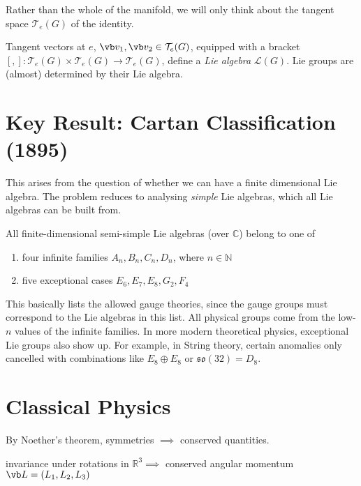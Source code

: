Rather than the whole of the manifold, we will only think about the tangent space $\mathcal{T}_e (G)$ of the identity.

Tangent vectors at $e$, $\vb v_1, \vb v_2 \in \mathcal{T}_e (G)$, equipped with a bracket $[, ]: \mathcal{T}_e(G) \times \mathcal{T}_e(G) \rightarrow \mathcal{T}_e(G)$, define a \emph{Lie algebra} $\mathcal{L}(G)$.
Lie groups are (almost) determined by their Lie algebra.

\section{Key Result: Cartan Classification (1895)}%
\label{sec:key_result_cartan_classification}

This arises from the question of whether we can have a finite dimensional Lie algebra. The problem reduces to analysing \emph{simple} Lie algebras, which all Lie algebras can be built from.

\begin{theorem}
  All finite-dimensional semi-simple Lie algebras (over $\mathbb{C}$) belong to one of
  \begin{enumerate}
    \item four infinite families $A_n, B_n, C_{n}, D_n$, where $n \in \mathbb{N}$
    \item five exceptional cases $E_6, E_7, E_8, G_2, F_4$
  \end{enumerate}
\end{theorem}

This basically lists the allowed gauge theories, since the gauge groups must correspond to the Lie algebras in this list. All physical groups come from the low-$n$ values of the infinite families. In more modern theoretical physics, exceptional Lie groups also show up. For example, in String theory, certain anomalies only cancelled with combinations like $E_8 \oplus E_8$ or $\mathfrak{so}(32) = D_8$.

\section{Classical Physics}%
\label{sec:classical_physics}

By Noether's theorem, symmetries $\implies$ conserved quantities.

\begin{example}
  invariance under rotations in $\mathbb{R}^3 \implies$ conserved angular momentum $\vb L = (L_1, L_2, L_3)$
\end{example}

